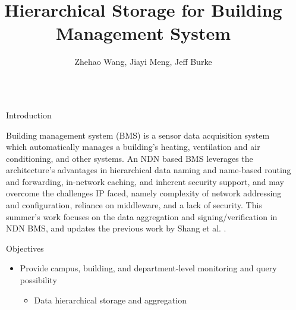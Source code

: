 \documentclass[final,hyperref={pdfpagelabels=false},20pt]{beamer}
\title{\huge Hierarchical Storage for Building Management System}
\author[AuthorNames]{Zhehao Wang\inst{1}, Jiayi Meng\inst{2}, Jeff Burke\inst{3}}
\institute[Institutes]{\inst{1} \inst{2} \inst{3} UCLA REMAP}
\begin{document}

\begin{frame}[t] %

\begin{columns}[t] %

\begin{column}{.02\textwidth}\end{column} %

\begin{column}{.465\textwidth} %


\begin{block}{Introduction}

Building management system (BMS) is a sensor data acquisition system which automatically manages a building's heating, ventilation and air conditioning, and other systems. \newline
An NDN based BMS leverages the architecture's advantages in hierarchical data naming and name-based routing and forwarding, in-network caching, and inherent security support, and may overcome the challenges IP faced, namely complexity of network addressing and configuration, reliance on middleware, and a lack of security. \newline
This summer's work focuses on the data aggregation and signing/verification in NDN BMS, and updates the previous work by Shang et al. \cite{wentao-bms}.

\end{block}


\begin{block}{Objectives}

\begin{itemize}
\item{Provide campus, building, and department-level monitoring and query possibility}
\begin{itemize}
\item{Data hierarchical storage and aggregation}


\end{itemize}
\end{itemize}
\end{block}
\end{column}
\end{columns}
\end{frame}
\end{document}
